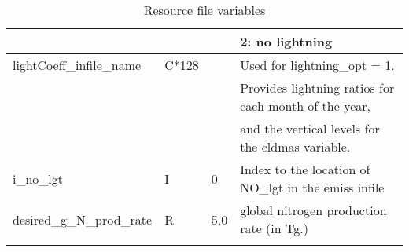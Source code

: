 {\begin{landscape}
\begin{center}
\begin{longtable}{|l|l|l|l|}
                 &   &   &         2:  no lightning  \\ \hline
lightCoeff\_infile\_name & C*128 & &  Used for lightning\_opt = 1.\\ 
             &     &  & Provides lightning ratios for each month of the year, \\
             &     &  & and the vertical levels for the cldmas variable. \\ \hline
i\_no\_lgt      & I & 0 & Index to the location of NO\_lgt in the emiss infile  \\ \hline
desired\_g\_N\_prod\_rate & R & 5.0 & global nitrogen production rate (in Tg.)  \\ \hline\hline
%
%
\caption{Resource file variables}
\label{tab:rcFile}
\end{longtable}
\end{center}

\end{landscape}

}
